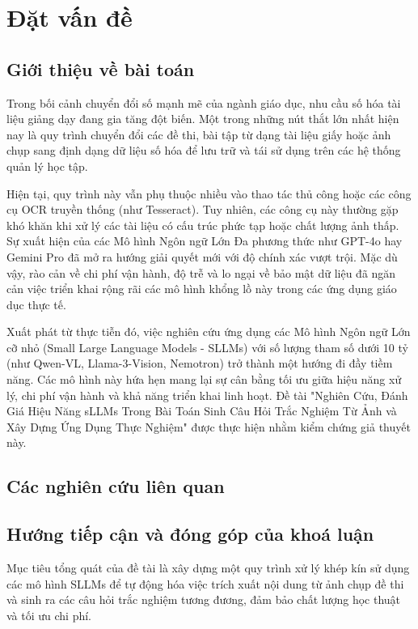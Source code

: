 \chapter{Đặt vấn đề}

\section{Giới thiệu về bài toán}

Trong bối cảnh chuyển đổi số mạnh mẽ của ngành giáo dục, nhu cầu số hóa tài liệu
giảng dạy đang gia tăng đột biến. Một trong những nút thắt lớn nhất hiện nay là quy
trình chuyển đổi các đề thi, bài tập từ dạng tài liệu giấy hoặc ảnh chụp sang
định dạng dữ liệu số hóa để lưu trữ và tái sử dụng trên các hệ thống quản lý học
tập.

Hiện tại, quy trình này vẫn phụ thuộc nhiều vào thao tác thủ công hoặc các công cụ
OCR truyền thống (như Tesseract). Tuy nhiên, các công cụ này thường gặp khó khăn
khi xử lý các tài liệu có cấu trúc phức tạp hoặc chất lượng ảnh thấp. Sự xuất
hiện của các Mô hình Ngôn ngữ Lớn Đa phương thức như GPT-4o hay Gemini Pro đã mở
ra hướng giải quyết mới với độ chính xác vượt trội. Mặc dù vậy, rào cản về chi
phí vận hành, độ trễ và lo ngại về bảo mật dữ liệu đã ngăn cản việc triển khai rộng
rãi các mô hình khổng lồ này trong các ứng dụng giáo dục thực tế.

Xuất phát từ thực tiễn đó, việc nghiên cứu ứng dụng các Mô hình Ngôn ngữ Lớn cỡ
nhỏ (Small Large Language Models - SLLMs) với số lượng tham số dưới 10 tỷ (như Qwen-VL,
Llama-3-Vision, Nemotron) trở thành một hướng đi đầy tiềm năng. Các mô hình này hứa
hẹn mang lại sự cân bằng tối ưu giữa hiệu năng xử lý, chi phí vận hành và khả
năng triển khai linh hoạt. Đề tài "Nghiên Cứu, Đánh Giá Hiệu Năng sLLMs Trong Bài
Toán Sinh Câu Hỏi Trắc Nghiệm Từ Ảnh và Xây Dựng Ứng Dụng Thực Nghiệm" được thực
hiện nhằm kiểm chứng giả thuyết này.

\section{Các nghiên cứu liên quan}

\section{Hướng tiếp cận và đóng góp của khoá luận}

Mục tiêu tổng quát của đề tài là xây dựng một quy trình xử lý khép kín sử dụng
các mô hình SLLMs để tự động hóa việc trích xuất nội dung từ ảnh chụp đề thi và
sinh ra các câu hỏi trắc nghiệm tương đương, đảm bảo chất lượng học thuật và tối
ưu chi phí.

